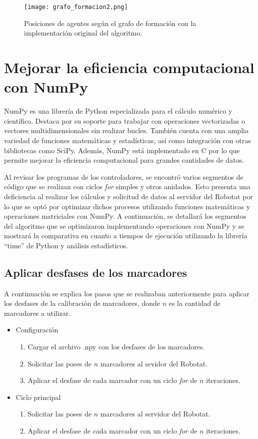 \begin{figure}[H]
	\centering
	\texttt{[image: grafo\_formacion2.png]}
	\caption{Posiciones de agentes según el grafo de formación con la implementación original del algoritmo.}
	\label{fig:grafo_formacion2}
\end{figure}
	
\section{Mejorar la eficiencia computacional con NumPy}
NumPy es una librería de Python especializada para el cálculo numérico y científico. Destaca por su soporte para trabajar con operaciones vectorizadas o vectores multidimensionales sin realizar bucles. También cuenta con una amplia variedad de funciones matemáticas y estadísticas, así como integración con otras bibliotecas como SciPy. Además, NumPy está implementado en C por lo que permite mejorar la eficiencia computacional para grandes cantidades de datos.

Al revisar los programas de los controladores, se encontró varios segmentos de código que se realizan con ciclos \textit{for} simples y otros anidados. Esto presenta una deficiencia al realizar los cálculos y solicitud de datos al servidor del Robotat por lo que se optó por optimizar dichos procesos utilizando funciones matemáticas y operaciones matriciales con NumPy. A continuación, se detallará los segmentos del algoritmo que se optimizaron implementando operaciones con NumPy y se mostrará la comparativa en cuanto a tiempos de ejecución utilizando la librería ``time'' de Python y análisis estadísticos.

\subsection{Aplicar desfases de los marcadores}
A continuación se explica los pasos que se realizaban anteriormente para aplicar los desfases de la calibración de marcadores, donde $n$ es la cantidad de marcadores a utilizar.


\begin{itemize}
	\item Configuración
	\begin{enumerate}
		\item Cargar el archivo .npy con los desfases de los marcadores.
		\item Solicitar las poses de $n$ marcadores al sevidor del Robotat.
		\item Aplicar el desfase de cada marcador con un ciclo \textit{for} de $n$ iteraciones.
	\end{enumerate}
	\item Ciclo principal 
	\begin{enumerate}
		\item Solicitar las poses de $n$ marcadores al servidor del Robotat.
		\item Aplicar el desfase de cada marcador con un ciclo \textit{for} de $n$ iteraciones.
	\end{enumerate}
\end{itemize}

